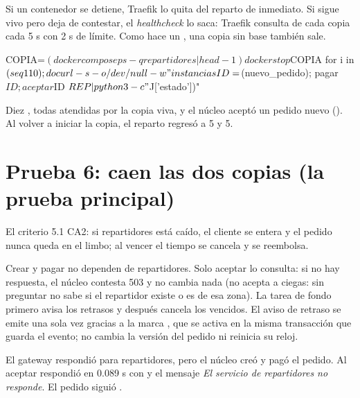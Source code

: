 \documentclass[11pt]{article}
\begin{document}
\comofunciona Si un contenedor se detiene, Traefik lo quita del reparto de inmediato. Si sigue vivo pero
deja de contestar, el \emph{healthcheck} lo saca: Traefik consulta  de cada copia cada 5 s
con 2 s de límite. Como  hace un , una copia sin base también sale.

\begin{comando}
COPIA=$(docker compose ps -q repartidores | head -1)
docker stop $COPIA
for i in $(seq 1 10); do curl -s -o /dev/null -w "%
instancias
ID=$(nuevo_pedido); pagar $ID; aceptar $ID $REP | python3 -c "$J['estado'])"
\end{comando}

\observado Diez , todas atendidas por la copia viva, y el núcleo aceptó un pedido nuevo
(). Al volver a iniciar la copia, el reparto regresó a 5 y 5.

\section{Prueba 6: caen las dos copias (la prueba principal)}

\queria El criterio 5.1 CA2: si repartidores está caído, el cliente se entera y el pedido nunca queda en
el limbo; al vencer el tiempo se cancela y se reembolsa.

\comofunciona Crear y pagar no dependen de repartidores. Solo aceptar lo consulta: si no hay respuesta,
el núcleo contesta 503 y no cambia nada (no acepta a ciegas: sin preguntar no sabe si el repartidor
existe o es de esa zona). La tarea de fondo primero avisa los retrasos y después cancela los vencidos.
El aviso de retraso se emite una sola vez gracias a la marca , que se activa en
la misma transacción que guarda el evento; no cambia la versión del pedido ni reinicia su reloj.


\observado El gateway respondió  para repartidores, pero el núcleo creó y pagó
el pedido. Al aceptar respondió en 0.089 s con  y el mensaje \emph{El servicio de repartidores
no responde}. El pedido siguió .
\end{document}
